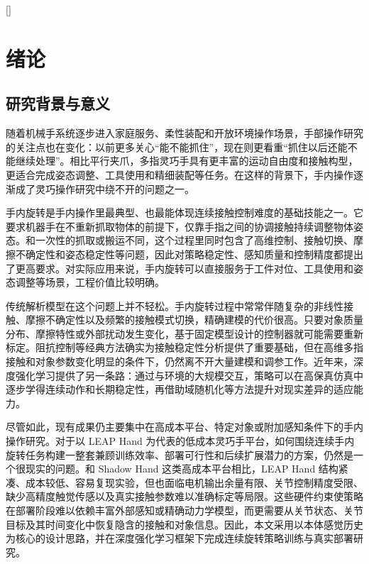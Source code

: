 
[]
\section{绪论}

\subsection{研究背景与意义}
\thesisbodyfont
随着机械手系统逐步进入家庭服务、柔性装配和开放环境操作场景，手部操作研究的关注点也在变化：以前更多关心“能不能抓住”，现在则更看重“抓住以后还能不能继续处理”。相比平行夹爪，多指灵巧手具有更丰富的运动自由度和接触构型，更适合完成姿态调整、工具使用和精细装配等任务\cite{bicchi2000,okamura2000,openai2018,xia2022}。在这样的背景下，手内操作逐渐成了灵巧操作研究中绕不开的问题之一。

手内旋转是手内操作里最典型、也最能体现连续接触控制难度的基础技能之一。它要求机器手在不重新抓取物体的前提下，仅靠手指之间的协调接触持续调整物体姿态。和一次性的抓取或搬运不同，这个过程里同时包含了高维控制、接触切换、摩擦不确定性和姿态稳定性等问题，因此对策略稳定性、感知质量和控制精度都提出了更高要求。对实际应用来说，手内旋转可以直接服务于工件对位、工具使用和姿态调整等场景，工程价值比较明确。

传统解析模型在这个问题上并不轻松。手内旋转过程中常常伴随复杂的非线性接触、摩擦不确定性以及频繁的接触模式切换，精确建模的代价很高。只要对象质量分布、摩擦特性或外部扰动发生变化，基于固定模型设计的控制器就可能需要重新标定。阻抗控制等经典方法确实为接触稳定性分析提供了重要基础\cite{hogan1985}，但在高维多指接触和对象参数变化明显的条件下，仍然离不开大量建模和调参工作。近年来，深度强化学习提供了另一条路：通过与环境的大规模交互，策略可以在高保真仿真中逐步学得连续动作和长期稳定性，再借助域随机化等方法提升对现实差异的适应能力\cite{tobin2017,peng2018,openai2018,openai2019,isaacgym2021}。

尽管如此，现有成果仍主要集中在高成本平台、特定对象或附加感知条件下的手内操作研究。对于以 LEAP Hand 为代表的低成本灵巧手平台，如何围绕连续手内旋转任务构建一整套兼顾训练效率、部署可行性和后续扩展潜力的方案，仍然是一个很现实的问题\cite{leaphand2023}。和 Shadow Hand 这类高成本平台相比，LEAP Hand 结构紧凑、成本较低、容易复现实验，但也面临电机输出余量有限、关节控制精度受限、缺少高精度触觉传感以及真实接触参数难以准确标定等局限。这些硬件约束使策略在部署阶段难以依赖丰富外部感知或精确动力学模型，而更需要从关节状态、关节目标及其时间变化中恢复隐含的接触和对象信息。因此，本文采用以本体感觉历史为核心的设计思路，并在深度强化学习框架下完成连续旋转策略训练与真实部署研究。


